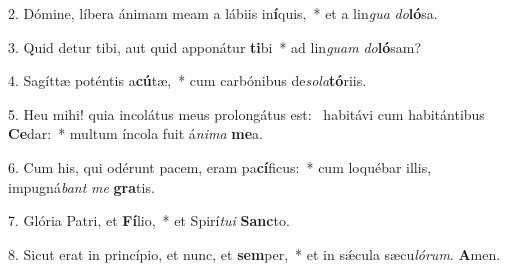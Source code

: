 2. Dómine, líbera ánimam meam a lábiis in\textbf{í}quis,~*  et a lin\textit{gua} \textit{do}\textbf{ló}sa.\

3. Quid detur tibi, aut quid apponátur \textbf{ti}bi~*  ad lin\textit{guam} \textit{do}\textbf{ló}sam?\

4. Sagíttæ poténtis a\textbf{cú}tæ,~*  cum carbónibus de\textit{so}\textit{la}\textbf{tó}riis.\

5. Heu mihi! quia incolátus meus prolongátus est: \dag\  habitávi cum habitántibus \textbf{Ce}dar:~*  multum íncola fuit á\textit{ni}\textit{ma} \textbf{me}a.\

6. Cum his, qui odérunt pacem, eram pa\textbf{cí}ficus:~*  cum loquébar illis, impugná\textit{bant} \textit{me} \textbf{gra}tis.\

7. Glória Patri, et \textbf{Fí}lio,~*  et Spirí\textit{tu}\textit{i} \textbf{Sanc}to.\

8. Sicut erat in princípio, et nunc, et \textbf{sem}per,~*  et in sǽcula sæcu\textit{ló}\textit{rum}. \textbf{A}men.\

